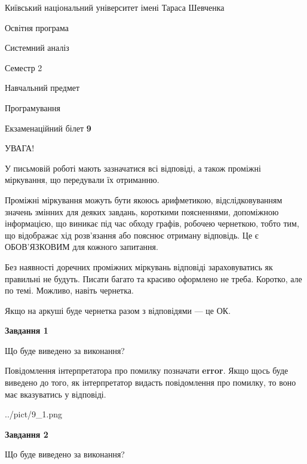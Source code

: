 \documentclass[12pt, ukrainian]{article}
\begin{document}
{{\begin {small}\par
{ \center  Київський національний університет імені Тараса Шевченка \par}
{\parbox {5 cm}{Освітня програма \hfill}{\parbox {7 cm}{Системний аналіз \hfill}}\parbox {6 cm}{\hfill Семестр 2}}\par
{\parbox {5 cm} {Навчальний предмет \hfill}\parbox {7 cm}{Програмування \hfill}\parbox {6cm}{\hfill}\par}\vspace{-7pt} \end{small}}{\center Екзаменаційний білет \No \textbf
{ 9 }\par}}
{
\begin {large}
УВАГА!

У письмовій роботі мають зазначатися всі відповіді, а також проміжні міркування, що передували їх отриманню.

Проміжні міркування можуть бути якоюсь арифметикою, відслідковуванням зна\-чень змінних для деяких завдань,
короткими поясненнями, допоміжною інформацією, що виникає під час обходу графів, робочею чернеткою,
тобто тим, що відображає хід розв’язання або пояснює отриману відповідь.
Це є ОБОВ’ЯЗКОВИМ для кожного запитання.

Без наявності доречних проміжних міркувань відповіді зараховуватись як правиль\-ні не будуть.
Писати багато та красиво оформлено не треба. Коротко, але по темі. Можли\-во, навіть чернетка.

Якщо на аркуші буде чернетка разом з відповідями --- це ОК.

\newpage

{\begin {center}\textbf{Завдання 1}\end {center}}\par
Що буде виведено за виконання?

Повідомлення інтерпретатора про помилку позначати \textbf{error}.
Якщо щось буде виведено до того, як інтерпретатор видасть повідомлення про помилку, 
то воно має вказуватись у відповіді. \par


\begin{center}
	{../pict/9_1.png}
\end{center}
\newpage

{\begin {center}\textbf{Завдання 2}\end {center}}\par
Що буде виведено за виконання?


\end{large}}
\end{document}
